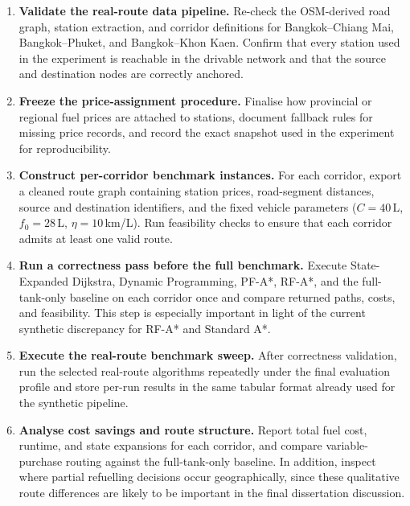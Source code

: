\begin{enumerate}
    \item \textbf{Validate the real-route data pipeline.}
          Re-check the OSM-derived road graph, station extraction, and corridor definitions for Bangkok--Chiang Mai, Bangkok--Phuket, and Bangkok--Khon Kaen.
          Confirm that every station used in the experiment is reachable in the drivable network and that the source and destination nodes are correctly anchored.

    \item \textbf{Freeze the price-assignment procedure.}
          Finalise how provincial or regional fuel prices are attached to stations, document fallback rules for missing price records, and record the exact snapshot used in the experiment for reproducibility.

    \item \textbf{Construct per-corridor benchmark instances.}
          For each corridor, export a cleaned route graph containing station prices, road-segment distances, source and destination identifiers, and the fixed vehicle parameters ($C=40$\,L, $f_0=28$\,L, $\eta=10$\,km/L).
          Run feasibility checks to ensure that each corridor admits at least one valid route.

    \item \textbf{Run a correctness pass before the full benchmark.}
          Execute State-Expanded Dijkstra, Dynamic Programming, PF-A*, RF-A*, and the full-tank-only baseline on each corridor once and compare returned paths, costs, and feasibility.
          This step is especially important in light of the current synthetic discrepancy for RF-A* and Standard A*.

    \item \textbf{Execute the real-route benchmark sweep.}
          After correctness validation, run the selected real-route algorithms repeatedly under the final evaluation profile and store per-run results in the same tabular format already used for the synthetic pipeline.

    \item \textbf{Analyse cost savings and route structure.}
          Report total fuel cost, runtime, and state expansions for each corridor, and compare variable-purchase routing against the full-tank-only baseline.
          In addition, inspect where partial refuelling decisions occur geographically, since these qualitative route differences are likely to be important in the final dissertation discussion.
 \end{enumerate}

